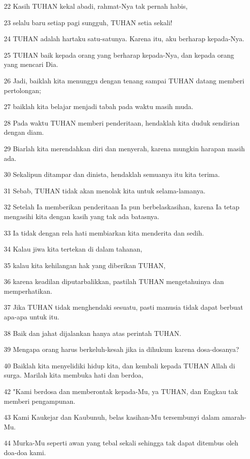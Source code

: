 \par 22 Kasih TUHAN kekal abadi, rahmat-Nya tak pernah habis,
\par 23 selalu baru setiap pagi sungguh, TUHAN setia sekali!
\par 24 TUHAN adalah hartaku satu-satunya. Karena itu, aku berharap kepada-Nya.
\par 25 TUHAN baik kepada orang yang berharap kepada-Nya, dan kepada orang yang mencari Dia.
\par 26 Jadi, baiklah kita menunggu dengan tenang sampai TUHAN datang memberi pertolongan;
\par 27 baiklah kita belajar menjadi tabah pada waktu masih muda.
\par 28 Pada waktu TUHAN memberi penderitaan, hendaklah kita duduk sendirian dengan diam.
\par 29 Biarlah kita merendahkan diri dan menyerah, karena mungkin harapan masih ada.
\par 30 Sekalipun ditampar dan dinista, hendaklah semuanya itu kita terima.
\par 31 Sebab, TUHAN tidak akan menolak kita untuk selama-lamanya.
\par 32 Setelah Ia memberikan penderitaan Ia pun berbelaskasihan, karena Ia tetap mengasihi kita dengan kasih yang tak ada batasnya.
\par 33 Ia tidak dengan rela hati membiarkan kita menderita dan sedih.
\par 34 Kalau jiwa kita tertekan di dalam tahanan,
\par 35 kalau kita kehilangan hak yang diberikan TUHAN,
\par 36 karena keadilan diputarbalikkan, pastilah TUHAN mengetahuinya dan memperhatikan.
\par 37 Jika TUHAN tidak menghendaki sesuatu, pasti manusia tidak dapat berbuat apa-apa untuk itu.
\par 38 Baik dan jahat dijalankan hanya atas perintah TUHAN.
\par 39 Mengapa orang harus berkeluh-kesah jika ia dihukum karena dosa-dosanya?
\par 40 Baiklah kita menyelidiki hidup kita, dan kembali kepada TUHAN Allah di surga. Marilah kita membuka hati dan berdoa,
\par 42 "Kami berdosa dan memberontak kepada-Mu, ya TUHAN, dan Engkau tak memberi pengampunan.
\par 43 Kami Kaukejar dan Kaubunuh, belas kasihan-Mu tersembunyi dalam amarah-Mu.
\par 44 Murka-Mu seperti awan yang tebal sekali sehingga tak dapat ditembus oleh doa-doa kami.
